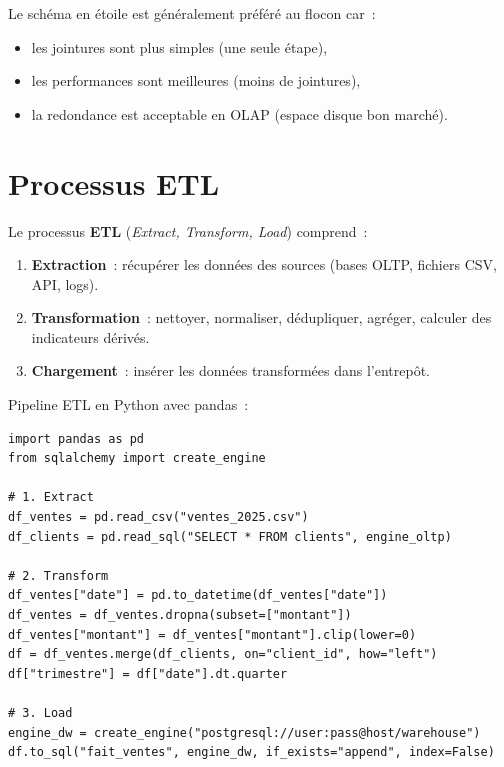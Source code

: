 \begin{attention}
Le sch\'ema en \'etoile est g\'en\'eralement pr\'ef\'er\'e au flocon car~:
\begin{itemize}
  \item les jointures sont plus simples (une seule \'etape),
  \item les performances sont meilleures (moins de jointures),
  \item la redondance est acceptable en OLAP (espace disque bon march\'e).
\end{itemize}
\end{attention}

\section{Processus ETL}

\begin{definition}[ETL]
Le processus \textbf{ETL} (\emph{Extract, Transform, Load}) comprend~:
\begin{enumerate}
  \item \textbf{Extraction}~: r\'ecup\'erer les donn\'ees des sources
        (bases OLTP, fichiers CSV, API, logs).
  \item \textbf{Transformation}~: nettoyer, normaliser, d\'edupliquer,
        agr\'eger, calculer des indicateurs d\'eriv\'es.
  \item \textbf{Chargement}~: ins\'erer les donn\'ees transform\'ees dans
        l'entrep\^ot.
\end{enumerate}
\end{definition}

\begin{exemple}
Pipeline ETL en Python avec pandas~:
\begin{verbatim}
import pandas as pd
from sqlalchemy import create_engine

# 1. Extract
df_ventes = pd.read_csv("ventes_2025.csv")
df_clients = pd.read_sql("SELECT * FROM clients", engine_oltp)

# 2. Transform
df_ventes["date"] = pd.to_datetime(df_ventes["date"])
df_ventes = df_ventes.dropna(subset=["montant"])
df_ventes["montant"] = df_ventes["montant"].clip(lower=0)
df = df_ventes.merge(df_clients, on="client_id", how="left")
df["trimestre"] = df["date"].dt.quarter

# 3. Load
engine_dw = create_engine("postgresql://user:pass@host/warehouse")
df.to_sql("fait_ventes", engine_dw, if_exists="append", index=False)
\end{verbatim}
\end{exemple}

